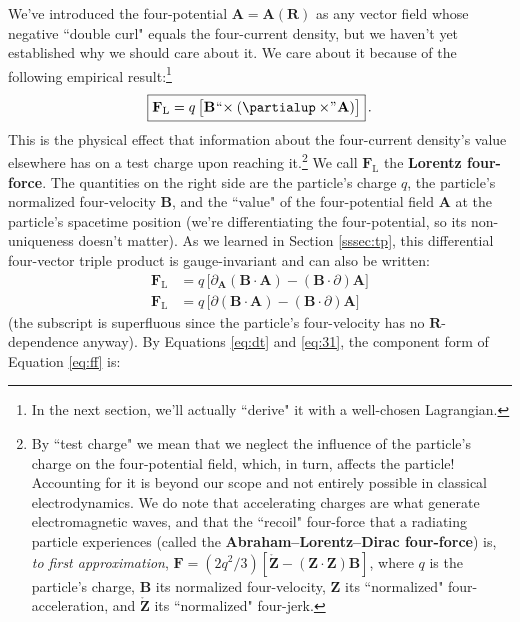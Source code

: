 \documentclass[12pt]{article}
\renewcommand{\vv}[1]{\mathbf{#1}}
\begin{document}
We've introduced the four-potential $\vv A = \vv A (\vv R)$ as any vector field whose negative ``double curl" equals the four-current density, but we haven't yet established why we should care about it. We care about it because of the following empirical result:\footnote{In the next section, we'll actually ``derive" it with a well-chosen Lagrangian.}
\begin{equation}\label{eq:ff}
\boxed{\vv F_{\textrm{L}} = q \, \bigl[ \vv B \mkern1mu `` \mkern-4mu \times (\partialup \times \mkern-4mu " \mkern1mu \vv A) \bigr]} \, .
\end{equation}
This is the physical effect that information about the four-current density's value elsewhere has on a test charge upon reaching it.\footnote{By ``test charge" we mean that we neglect the influence of the particle's charge on the four-potential field, which, in turn, affects the particle! Accounting for it is beyond our scope and not entirely possible in classical electrodynamics. We do note that accelerating charges are what generate electromagnetic waves, and that the ``recoil" four-force that a radiating particle experiences (called the \textbf{Abraham--Lorentz--Dirac four-force}) is, \emph{to first approximation}, $\vv F = (2q^2 / 3)[\mathring{\vv Z} - (\vv Z \cdot \vv Z) \vv B]$, where $q$ is the particle's charge, $\vv B$ its normalized four-velocity, $\vv Z$ its ``normalized" four-acceleration, and $\mathring{\vv Z}$ its ``normalized" four-jerk.} We call $\vv F_{\textrm{L}}$ the \textbf{Lorentz four-force}. The quantities on the right side are the particle's charge $q$, the particle's normalized four-velocity $\vv B$, and the ``value" of the four-potential field $\vv A$ at the particle's spacetime position (we're differentiating the four-potential, so its non-uniqueness doesn't matter). As we learned in Section \ref{sssec:tp}, this differential four-vector triple product is gauge-invariant and can also be written:
\begin{equation}\label{eq:lff}
\begin{split}
\vv F_{\textrm{L}} &= q \, \bigl[ \partialup_{\vv A} (\vv B \cdot \vv A) - (\vv B \cdot \partialup) \vv A \bigr] \\
\vv F_{\textrm{L}} &= q \, \bigl[ \partialup (\vv B \cdot \vv A) - (\vv B \cdot \partialup) \vv A \bigr] 
\end{split}
\end{equation}
(the subscript is superfluous since the particle's four-velocity has no $\vv R$-dependence anyway). By Equations \ref{eq:dt} and \ref{eq:31}, the component form of Equation \ref{eq:ff} is:
\end{document}
